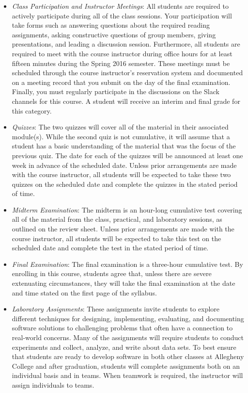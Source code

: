 \begin{itemize}

  \item {\em Class Participation and Instructor Meetings}: All students are required to actively participate during all
    of the class sessions. Your participation will take forms such as answering questions about the required reading
    assignments, asking constructive questions of group members, giving presentations, and leading a discussion session.
    Furthermore, all students are required to meet with the course instructor during office hours for at least fifteen
    minutes during the Spring 2016 semester.  These meetings must be scheduled through the course instructor's reservation
    system and documented on a meeting record that you submit on the day of the final examination. Finally, you must
    regularly participate in the discussions on the Slack channels for this course. A student will receive an interim
    and final grade for this category.

  \item {\em Quizzes}: The two quizzes will cover all of the material in their associated module(s).  While the second
    quiz is not cumulative, it will assume that a student has a basic understanding of the material that
    was the focus of the previous quiz.  The date for each of the quizzes will be announced at least one week in
    advance of the scheduled date.  Unless prior arrangements are made with the course instructor, all students will be
    expected to take these two quizzes on the scheduled date and complete the quizzes in the stated period of time.

  \item {\em Midterm Examination}: The midterm is an hour-long cumulative test covering all of the material from the
    class, practical, and laboratory sessions, as outlined on the review sheet. Unless prior arrangements are made with
    the course instructor, all students will be expected to take this test on the scheduled date and complete the test
    in the stated period of time.

  \item {\em Final Examination}: The final examination is a three-hour cumulative test.  By enrolling in this
    course, students agree that, unless there are severe extenuating circumstances, they will take the final examination
    at the date and time stated on the first page of the syllabus.

  \item {\em Laboratory Assignments}: These assignments invite students to explore different techniques for designing,
    implementing, evaluating, and documenting software solutions to challenging problems that often have a connection to
    real-world concerns.  Many of the assignments will require students to conduct experiments and collect, analyze, and
    write about data sets.  To best ensure that students are ready to develop software in both other classes at
    Allegheny College and after graduation, students will complete assignments both on an individual basis and in teams.
    When teamwork is required, the instructor will assign individuals to teams.


\end{itemize}
